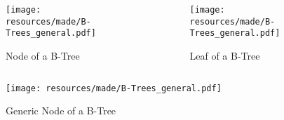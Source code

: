 \begin{frame}
    \framebreak{}
    \begin{columns}
        \begin{column}{0.35\textwidth}
                \begin{figure}
                    \texttt{[image: resources/made/B-Trees\_general.pdf]}
                    \caption[]{Node of a B-Tree}
                \end{figure}
        \end{column}
        \begin{column}{0.35\textwidth}
                \begin{figure}
                    \texttt{[image: resources/made/B-Trees\_general.pdf]}
                    \caption[]{Leaf of a B-Tree}
                \end{figure}
        \end{column}
    \end{columns}
    \begin{figure}
        \texttt{[image: resources/made/B-Trees\_general.pdf]}
        \caption[]{Generic Node of a B-Tree}
    \end{figure}
\end{frame}
